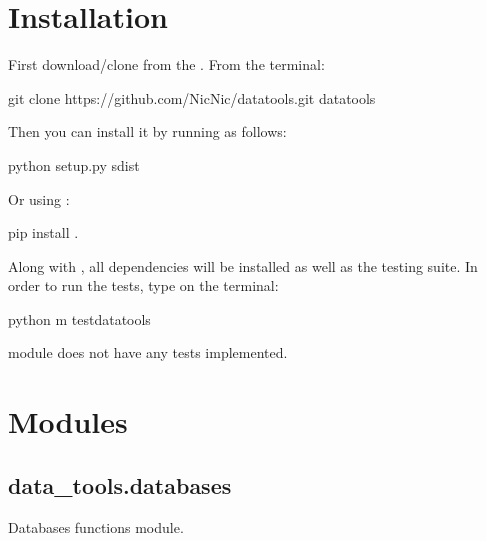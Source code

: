 \documentclass[letterpaper,10pt,english]{sphinxmanual}
\begin{document}
\chapter{Installation}
\label{\detokenize{index:installation}}
First download/clone  from the
.
From the terminal:

%
\begin{sphinxVerbatim}[commandchars=\\\{\}]
git clone https://github.com/Nic\PYGZhy{}Nic/data\PYGZus{}tools.git
 data\PYGZus{}tools
\end{sphinxVerbatim}

Then you can install it by running  as follows:

%
\begin{sphinxVerbatim}[commandchars=\\\{\}]
python setup.py sdist
\end{sphinxVerbatim}

Or using :

%
\begin{sphinxVerbatim}[commandchars=\\\{\}]
pip install .
\end{sphinxVerbatim}

Along with , all dependencies will be installed as well as
the testing suite. In order to run the tests, type on the terminal:

%
\begin{sphinxVerbatim}[commandchars=\\\{\}]
python \PYGZhy{}m test\PYGZus{}data\PYGZus{}tools
\end{sphinxVerbatim}

  module does not have any tests
implemented.


\chapter{Modules}
\label{\detokenize{index:modules}}\label{\detokenize{databases:module-data_tools.databases}}

\section{data\_tools.databases}
\label{\detokenize{databases:data-tools-databases}}\label{\detokenize{databases::doc}}
Databases functions module.
\end{document}
